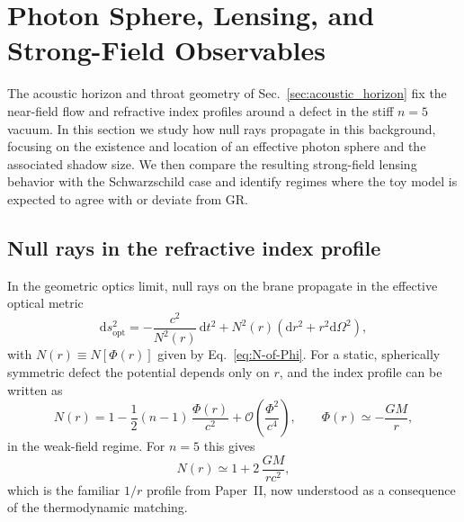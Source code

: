 \documentclass[11pt]{article}
\begin{document}
\section{Photon Sphere, Lensing, and Strong-Field Observables}
\label{sec:photon_sphere}

The acoustic horizon and throat geometry of Sec.~\ref{sec:acoustic_horizon}
fix the near-field flow and refractive index profiles around a defect in the
stiff \(n=5\) vacuum.  In this section we study how null rays propagate in
this background, focusing on the existence and location of an effective
photon sphere and the associated shadow size.  We then compare the resulting
strong-field lensing behavior with the Schwarzschild case and identify
regimes where the toy model is expected to agree with or deviate from GR.

\subsection{Null rays in the refractive index profile}
\label{subsec:photon-null-rays}

In the geometric optics limit, null rays on the brane propagate in the
effective optical metric
\begin{equation}
  \mathrm{d}s_{\text{opt}}^2
  = -\frac{c^2}{N^2(r)}\,\mathrm{d}t^2
    + N^2(r)
      \left( \mathrm{d}r^2
      + r^2 \mathrm{d}\Omega^2 \right),
  \label{eq:optical-metric-spherical}
\end{equation}
with \(N(r) \equiv N[\Phi(r)]\) given by Eq.~\eqref{eq:N-of-Phi}.  For a
static, spherically symmetric defect the potential depends only on \(r\),
and the index profile can be written as
\begin{equation}
  N(r)
  = 1 - \frac{1}{2}(n-1)\,\frac{\Phi(r)}{c^2}
    + \mathcal{O}\!\left(\frac{\Phi^2}{c^4}\right),
  \qquad
  \Phi(r) \simeq -\frac{G M}{r},
  \label{eq:N-of-r-approx}
\end{equation}
in the weak-field regime.  For \(n=5\) this gives
\begin{equation}
  N(r)
  \simeq 1 + 2\,\frac{G M}{r c^2},
  \label{eq:N-of-r-n5}
\end{equation}
which is the familiar \(1/r\) profile from Paper~II, now understood as a
consequence of the thermodynamic matching.
\end{document}
